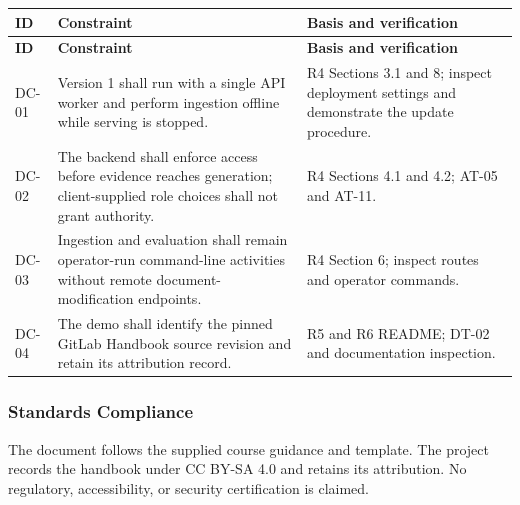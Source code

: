 \documentclass[11pt,letterpaper]{article}
\begin{document}
\begin{longtable}{|P{\arrayrulewidth\relax}|P{\arrayrulewidth\relax}|P{\arrayrulewidth\relax}|}

\hline{}

\textbf{ID} & \textbf{Constraint} & \textbf{Basis and verification} \\ \hline

\endfirsthead

\hline{}

\textbf{ID} & \textbf{Constraint} & \textbf{Basis and verification} \\ \hline

\endhead

\hline\endfoot

\hline\endlastfoot

DC-01 & Version 1 shall run with a single API worker and perform ingestion offline while serving is stopped. & R4 Sections 3.1 and 8; inspect deployment settings and demonstrate the update procedure. \\ \hline

DC-02 & The backend shall enforce access before evidence reaches generation; client-supplied role choices shall not grant authority. & R4 Sections 4.1 and 4.2; AT-05 and AT-11. \\ \hline

DC-03 & Ingestion and evaluation shall remain operator-run command-line activities without remote document-modification endpoints. & R4 Section 6; inspect routes and operator commands. \\ \hline

DC-04 & The demo shall identify the pinned GitLab Handbook source revision and retain its attribution record. & R5 and R6 README; DT-02 and documentation inspection. \\ \hline

\end{longtable}

\endgroup

\subsubsection{Standards Compliance}

The document follows the supplied course guidance and template. The project records the handbook under CC BY-SA 4.0 and retains its attribution. No regulatory, accessibility, or security certification is claimed.\par
\end{document}
